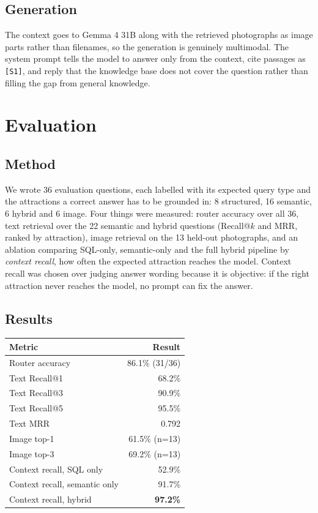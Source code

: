 \documentclass[11pt,a4paper]{article}
\newcommand{\code}[1]{\texttt{\small #1}}
\begin{document}
\subsection{Generation}

The context goes to Gemma 4 31B along with the retrieved photographs as image
parts rather than filenames, so the generation is genuinely multimodal. The
system prompt tells the model to answer only from the context, cite passages
as \code{[S1]}, and reply that the knowledge base does not cover the question
rather than filling the gap from general knowledge.

\section{Evaluation}
\label{sec:eval}

\subsection{Method}

We wrote 36 evaluation questions, each labelled with its expected query type
and the attractions a correct answer has to be grounded in: 8 structured, 16
semantic, 6 hybrid and 6 image. Four things were measured: router accuracy
over all 36, text retrieval over the 22 semantic and hybrid questions
(Recall@$k$ and MRR, ranked by attraction), image retrieval on the 13
held-out photographs, and an ablation comparing SQL-only, semantic-only and
the full hybrid pipeline by \textit{context recall}, how often the expected
attraction reaches the model. Context recall was chosen over judging answer
wording because it is objective: if the right attraction never reaches the
model, no prompt can fix the answer.

\subsection{Results}

\begin{center}
\begin{tabular}{@{}lr@{}}
\toprule
\textbf{Metric} & \textbf{Result} \\
\midrule
Router accuracy   & 86.1\% (31/36) \\
Text Recall@1     & 68.2\% \\
Text Recall@3     & 90.9\% \\
Text Recall@5     & 95.5\% \\
Text MRR          & 0.792 \\
Image top-1       & 61.5\% (n=13) \\
Image top-3       & 69.2\% (n=13) \\
\midrule
Context recall, SQL only      & 52.9\% \\
Context recall, semantic only & 91.7\% \\
Context recall, hybrid        & \textbf{97.2\%} \\
\bottomrule
\end{tabular}
\end{center}
\end{document}
